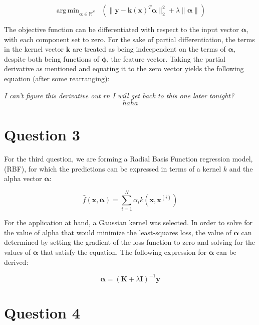 \documentclass{article}
\DeclareMathOperator*{\argmin}{arg\,min}
\begin{document}
\begin{equation}
\argmin_{\boldsymbol\alpha \in \mathbb{R}^N} \;\; (\| \mathbf{y} - \mathbf{k(x)}^T\boldsymbol\alpha \|_{2}^2 + \lambda \|\boldsymbol\alpha \|)
\end{equation}

The objective function can be differentiated with respect to the input vector $\boldsymbol\alpha$, with each component set to zero. For the sake of partial differentiation, the terms in the kernel vector $\mathbf{k}$ are treated as being indeependent on the terms of $\boldsymbol\alpha$, despite both being functions of $\boldsymbol\phi$, the feature vector. Taking the partial derivative as mentioned and equating it to the zero vector yields the following equation (after some rearranging):

\textit{I can't figure this derivative out rn I will get back to this one later tonight?}
\begin{equation}
haha
\end{equation}

\section*{Question 3}
For the third question, we are forming a Radial Basis Function regression model, (RBF), for which the predictions can be expressed in terms of a kernel $k$ and the alpha vector $\boldsymbol\alpha$:

\begin{equation}
\hat{f}(\mathbf{x}, \boldsymbol\alpha) = \sum_{i=1}^{N} \alpha_i k(\mathbf{x}, \mathbf{x}^{(i)})
\end{equation}

For the application at hand, a Gaussian kernel was selected. In order to solve for the value of alpha that would minimize the least-squares loss, the value of $\boldsymbol\alpha$ can determined by setting the gradient of the loss function to zero and solving for the values of $\boldsymbol\alpha$ that satisfy the equation. The following expression for $\boldsymbol\alpha$ can be derived:

\begin{equation}
\boldsymbol\alpha = (\mathbf{K} + \lambda \mathbf{I})^{-1} \mathbf{y}
\end{equation}


\section*{Question 4}
\end{document}

